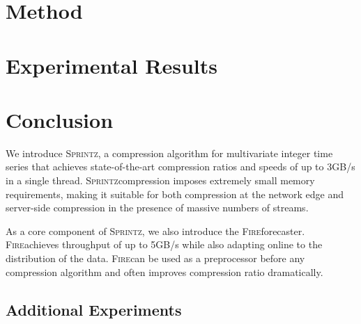 \documentclass{vldb}
\newcommand{\minesp}{\textsc{Sprintz}\text{ }}
\newcommand{\fire}{\textsc{Fire}\text{ }}
\begin{document}
\section{Method} \label{sec:method}



\section{Experimental Results} \label{sec:results}



\section{Conclusion} \label{sec:conclusion}

We introduce \minesp, a compression algorithm for multivariate integer time series that achieves state-of-the-art compression ratios and speeds of up to 3GB/s in a single thread. \minesp compression imposes extremely small memory requirements, making it suitable for both compression at the network edge and server-side compression in the presence of massive numbers of streams. %

As a core component of \minesp, we also introduce the \fire forecaster. \fire achieves throughput of up to 5GB/s while also adapting online to the distribution of the data. \fire can be used as a preprocessor before any compression algorithm and often improves compression ratio dramatically.


\begin{appendix}
\section{Additional Experiments} \label{sec:moreResults}



\end{appendix}
\vspace{-1mm}


% 


\end{document}
